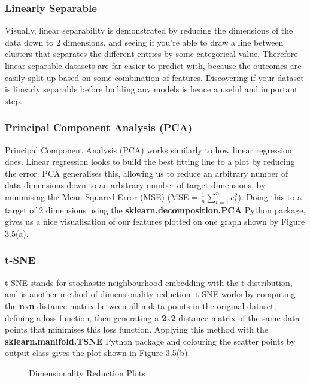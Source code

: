 \documentclass[12pt,a4paper,twoside,openright]{report}
\begin{document}
\subsubsection{Linearly Separable}

Visually, linear separability is demonstrated by reducing the dimensions of the data down to 2 dimensions, and seeing if you're able to draw a line between clusters that separates the different entries by some categorical value. Therefore linear separable datasets are far easier to predict with, because the outcomes are easily split up based on some combination of features. Discovering if your dataset is linearly separable before building any models is hence a useful and important step.

\subsubsection{Principal Component Analysis (PCA)}

Principal Component Analysis (PCA) works similarly to how linear regression does. Linear regression looks to build the best fitting line to a plot by reducing the error. PCA generalises this, allowing us to reduce an arbitrary number of data dimensions down to an arbitrary number of target dimensions, by minimising the Mean Squared Error (MSE) (MSE = $\frac{1}{n}\sum_{t=1}^{n}e_t^2$). Doing this to a target of 2 dimensions using the \textbf{sklearn.decomposition.PCA} Python package, gives us a nice visualisation of our features plotted on one graph shown by Figure 3.5(a).

\subsubsection{t-SNE}

t-SNE stands for stochastic neighbourhood embedding with the t distribution, and is another method of dimensionality reduction. t-SNE works by computing the \textbf{n}x\textbf{n} distance matrix between all n data-points in the original dataset, defining a loss function, then generating a \textbf{2}x\textbf{2} distance matrix of the same data-points that minimises this loss function. Applying this method with the \textbf{sklearn.manifold.TSNE} Python package and colouring the scatter points by output class gives the plot shown in Figure 3.5(b).

\begin{figure}[h]%
    \centering
    \qquad
    \caption{Dimensionality Reduction Plots}%
    \label{fig:dimensionality-reduction-plots}%
\end{figure}
\end{document}
